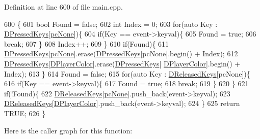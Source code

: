 Definition at line 600 of file main.\+cpp.


\begin{DoxyCode}
600                                                                                          \{
601     \textcolor{keywordtype}{bool} Found = \textcolor{keyword}{false};
602     \textcolor{keywordtype}{int} Index = 0;
603     \textcolor{keywordflow}{for}(\textcolor{keyword}{auto} Key : \hyperlink{classCApplicationData_ac6f50c764f7561c0bd2a9fbce55b2701}{DPressedKeys}[\hyperlink{GameDataTypes_8h_aafb0ca75933357ff28a6d7efbdd7602fa88767aa8e02c7b3192bbab4127b3d729}{pcNone}])\{
604         \textcolor{keywordflow}{if}(Key == event->keyval)\{
605             Found = \textcolor{keyword}{true};
606             \textcolor{keywordflow}{break};
607         \}
608         Index++;
609     \}
610     \textcolor{keywordflow}{if}(Found)\{
611         \hyperlink{classCApplicationData_ac6f50c764f7561c0bd2a9fbce55b2701}{DPressedKeys}[\hyperlink{GameDataTypes_8h_aafb0ca75933357ff28a6d7efbdd7602fa88767aa8e02c7b3192bbab4127b3d729}{pcNone}].erase(\hyperlink{classCApplicationData_ac6f50c764f7561c0bd2a9fbce55b2701}{DPressedKeys}[pcNone].begin() + Index);
612         \hyperlink{classCApplicationData_ac6f50c764f7561c0bd2a9fbce55b2701}{DPressedKeys}[\hyperlink{classCApplicationData_a53550939b20cba70570f113e4d1c5d02}{DPlayerColor}].erase(\hyperlink{classCApplicationData_ac6f50c764f7561c0bd2a9fbce55b2701}{DPressedKeys}[
      \hyperlink{classCApplicationData_a53550939b20cba70570f113e4d1c5d02}{DPlayerColor}].begin() + Index);
613     \}
614     Found = \textcolor{keyword}{false};
615     \textcolor{keywordflow}{for}(\textcolor{keyword}{auto} Key : \hyperlink{classCApplicationData_adcef59167cadd8ee516884a7c0df08f6}{DReleasedKeys}[pcNone])\{
616         \textcolor{keywordflow}{if}(Key == event->keyval)\{
617             Found = \textcolor{keyword}{true};
618             \textcolor{keywordflow}{break};
619         \}
620     \}
621     \textcolor{keywordflow}{if}(!Found)\{
622         \hyperlink{classCApplicationData_adcef59167cadd8ee516884a7c0df08f6}{DReleasedKeys}[\hyperlink{GameDataTypes_8h_aafb0ca75933357ff28a6d7efbdd7602fa88767aa8e02c7b3192bbab4127b3d729}{pcNone}].push\_back(event->keyval);
623         \hyperlink{classCApplicationData_adcef59167cadd8ee516884a7c0df08f6}{DReleasedKeys}[\hyperlink{classCApplicationData_a53550939b20cba70570f113e4d1c5d02}{DPlayerColor}].push\_back(event->keyval);
624     \}
625     \textcolor{keywordflow}{return} TRUE;
626 \}
\end{DoxyCode}
Here is the caller graph for this function\+:\nopagebreak
